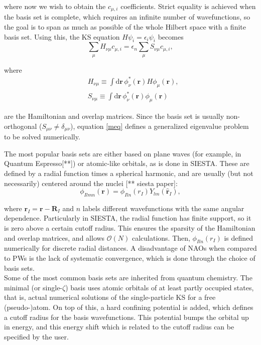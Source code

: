 where now we wish to obtain the \(c_{\mu,i}\) coefficients. Strict equality is achieved when the basis set is complete, which requires an infinite number of wavefunctions, so the goal is to span as much as possible of the whole Hilbert space with a finite basis set. Using this, the KS equation \(H\psi_i=\epsilon_i\psi_i\) becomes
\begin{equation}
\label{meq}	
\sum_{\mu} H_{\nu \mu} c_{\mu, i}=\epsilon_{n} \sum_{\mu} S_{\nu \mu} c_{\mu, i},
\end{equation}

where
\begin{equation}
	\begin{split}
		&H_{\nu \mu} \equiv \int \mathrm{d} \bm{r}\, \phi_{\nu}^{*}(\mathbf{r}) H \phi_{\mu}(\bm{r}), \\
		&S_{\nu \mu} \equiv \int \mathrm{d} \bm{r}\, \phi_{\nu}^{*}(\mathbf{r}) \phi_{\mu}(\bm{r})
	\end{split}
\end{equation}

are the Hamiltonian and overlap matrices. Since the basis set is usually non-orthogonal (\(S_{\mu\nu}\neq\delta_{\mu\nu}\)), equation \ref{meq} defines a generalized eigenvalue problem to be solved numerically.

The most popular basis sets are either based on plane waves (for example, in Quantum Espresso[**]) or atomic-like orbitals, as is done in SIESTA. These are defined by a radial function times a spherical harmonic, and are usually (but not necessarily) centered around the nuclei [** siesta paper]:
\begin{equation}
	\phi_{Ilmn}(\bm{r})=\phi_{Iln}\left(r_{I}\right)Y_{lm}\left(\hat{\bm{r}}_{I}\right),
\end{equation}

where \(\bm r_I=\bm r-\bm R_I\) and \(n\) labels different wavefunctions with the same angular dependence. Particularly in SIESTA, the radial function has finite support, so it is zero above a certain cutoff radius. This ensures the sparsity of the Hamiltonian and overlap matrices, and allows \(\mathcal{O}(N)\) calculations. Then, \(\phi_{Iln}\left(r_{I}\right)\) is defined numerically for discrete radial distances. A disadvantage of NAOs when compared to PWs is the lack of systematic convergence, which is done through the choice of basis sets.\\

Some of the most common basis sets are inherited from quantum chemistry. The minimal (or single-\(\zeta\)) basis uses atomic orbitals of at least partly occupied states, that is, actual numerical solutions of the single-particle KS for a free (pseudo-)atom. On top of this, a hard confining potential is added, which defines a cutoff radius for the basis wavefunctions. This potential bumps the orbital up in energy, and this energy shift which is related to the cutoff radius can be specified by the user.\\

